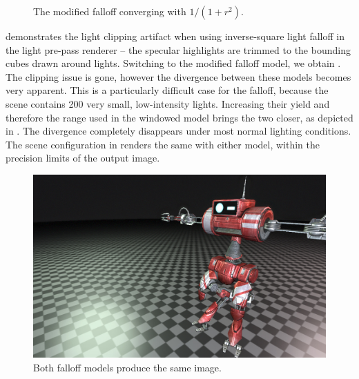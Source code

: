 \begin{figure}[ht!]
  \centering
  \caption[Modified falloff, better case]{The modified falloff converging with $1 / (1 + r^2)$.}
\label{fig:lppFalloffBetterCase}
\end{figure}

 demonstrates the light clipping artifact when using inverse-square light falloff in the light pre-pass renderer -- the specular highlights are trimmed to the bounding cubes drawn around lights. Switching to the modified falloff model, we obtain . The clipping issue is gone, however the divergence between these models becomes very apparent. This is a particularly difficult case for the falloff, because the scene contains 200 very small, low-intensity lights. Increasing their yield and therefore the range used in the windowed model brings the two closer, as depicted in . The divergence completely disappears under most normal lighting conditions. The scene configuration in  renders the same with either model, within the precision limits of the output image.

\begin{figure}[ht!]
  \centering
    \includegraphics[width=0.45\linewidth]{./Figures/lightPrePass/falloffSame.jpg}
    \caption[Falloffs converged]{Both falloff models produce the same image.}
  \label{fig:lppFalloffConverged}
\end{figure}

